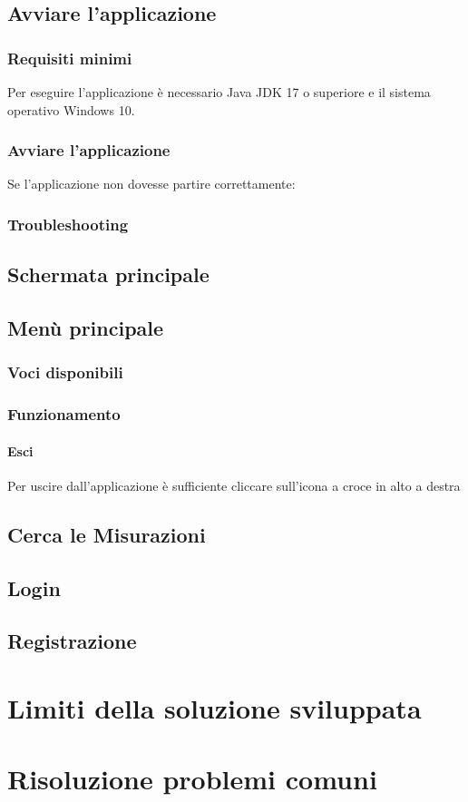 \documentclass[12pt]{scrreprt}
\begin{document}
	\newpage

	\section{Avviare l'applicazione}

		\subsection{Requisiti minimi}
		Per eseguire l’applicazione è necessario Java JDK 17 o superiore e il sistema operativo Windows 10.

		\subsection{Avviare l'applicazione}
		Se l’applicazione non dovesse partire correttamente:

		\subsection{Troubleshooting}

	\section{Schermata principale}

	\section{Menù principale}
	\subsection{Voci disponibili}
	\subsection{Funzionamento}
			\subsubsection{Esci}
			Per uscire dall’applicazione è sufficiente cliccare sull’icona a croce in alto a destra

	\section{Cerca le Misurazioni}
	\section{Login}
	\section{Registrazione}

	\chapter{Limiti della soluzione sviluppata}
	\chapter{Risoluzione problemi comuni}

	\nocite{IuriTex}
	
	
	\printindex
\end{document}
